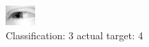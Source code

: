 \begin{figure}[h!]
\begin{center}
\includegraphics[width=0.60\columnwidth]{figures/ID2528_class_3_target_4.png}
\end{center}
\caption{ Classification: 3 actual target: 4}
\label{fig:ID2528_class_3_target_4}
\end{figure}
